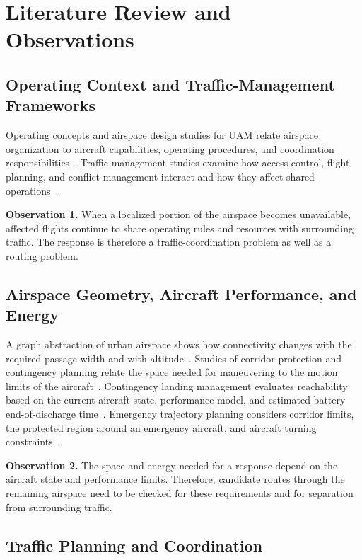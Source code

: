 \documentclass[11pt,letterpaper]{article}
\newcommand{\observation}[2]{\par\noindent\textbf{Observation #1.} #2\par}
\begin{document}
\section{Literature Review and Observations}
\label{sec:literature-review}

\subsection{Operating Context and Traffic-Management Frameworks}
\label{sec:literature-1}

Operating concepts and airspace design studies for UAM relate airspace organization to aircraft capabilities, operating procedures, and coordination responsibilities~\cite{FAA2023_L088,Bauranov2021_L024}. Traffic management studies examine how access control, flight planning, and conflict management interact and how they affect shared operations~\cite{Ramee2021_L028,Prince2025_L041}.

\observation{1}{When a localized portion of the airspace becomes unavailable, affected flights continue to share operating rules and resources with surrounding traffic. The response is therefore a traffic-coordination problem as well as a routing problem.}

\subsection{Airspace Geometry, Aircraft Performance, and Energy}
\label{sec:literature-2}

A graph abstraction of urban airspace shows how connectivity changes with the required passage width and with altitude~\cite{Cho2021_L037}. Studies of corridor protection and contingency planning relate the space needed for maneuvering to the motion limits of the aircraft~\cite{Choi2026_L036,Ortlieb2021_L020}. Contingency landing management evaluates reachability based on the current aircraft state, performance model, and estimated battery end-of-discharge time~\cite{Kim2026_L066}. Emergency trajectory planning considers corridor limits, the protected region around an emergency aircraft, and aircraft turning constraints~\cite{Variny2025_L015}.

\observation{2}{The space and energy needed for a response depend on the aircraft state and performance limits. Therefore, candidate routes through the remaining airspace need to be checked for these requirements and for separation from surrounding traffic.}

\subsection{Traffic Planning and Coordination}
\label{sec:literature-3}
\end{document}

